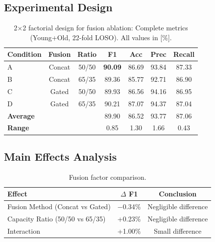 \documentclass{article}
\begin{document}
\subsection{Experimental Design}

\begin{table}[htbp]
    \centering
    \caption{2$\times$2 factorial design for fusion ablation: Complete metrics (Young+Old, 22-fold LOSO). All values in [\%].}
    \label{tab:factorial}
    \begin{tabular}{lcccccc}
        \toprule
        \textbf{Condition} & \textbf{Fusion} & \textbf{Ratio} & \textbf{F1} & \textbf{Acc} & \textbf{Prec} & \textbf{Recall} \\
        \midrule
        A & Concat & 50/50 & \textbf{90.09} & 86.69 & 93.84 & 87.33 \\
        B & Concat & 65/35 & 89.36 & 85.77 & 92.71 & 86.90 \\
        C & Gated & 50/50 & 89.93 & 86.56 & 94.16 & 86.95 \\
        D & Gated & 65/35 & 90.21 & 87.07 & 94.37 & 87.04 \\
        \midrule
        \multicolumn{3}{l}{\textbf{Average}} & 89.90 & 86.52 & 93.77 & 87.06 \\
        \multicolumn{3}{l}{\textbf{Range}} & 0.85 & 1.30 & 1.66 & 0.43 \\
        \bottomrule
    \end{tabular}
\end{table}

\subsection{Main Effects Analysis}

\begin{table}[htbp]
    \centering
    \caption{Fusion factor comparison.}
    \label{tab:fusion_stats}
    \begin{tabular}{lcc}
        \toprule
        \textbf{Effect} & \textbf{$\Delta$ F1} & \textbf{Conclusion} \\
        \midrule
        Fusion Method (Concat vs Gated) & $-$0.34\% & Negligible difference \\
        Capacity Ratio (50/50 vs 65/35) & +0.23\% & Negligible difference \\
        Interaction & +1.00\% & Small difference \\
        \bottomrule
    \end{tabular}
\end{table}
\end{document}
